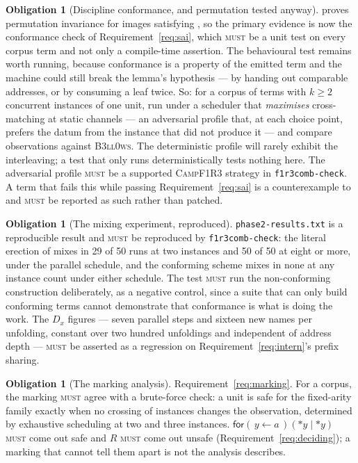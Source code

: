 \documentclass[11pt,a4paper]{article}
\newcommand{\code}[1]{\texttt{#1}}
\newcommand{\Camp}{\textsc{CampF1R3}}
\newcommand{\Bell}{\textsc{B3ll0ws}}
\newcommand{\MUST}{\textsc{must}}
\newcommand{\drp}[1]{{*}#1}
\newcommand{\inp}[3]{\mathsf{for}(\,#1 \leftarrow #2\,)#3}
\theoremstyle{definition}
\newtheorem{obligation}[definition]{Obligation}
\theoremstyle{plain}
\begin{document}
\begin{obligation}[Discipline conformance, and permutation tested anyway]
\label{obl:permutetest}
\cite[Lem.~6.11]{draft3} proves permutation invariance for images satisfying
\cite[Def.~6.10]{draft3}, so the primary evidence is now the conformance check
of Requirement~\ref{req:sai}, which \MUST{} be a unit test on every corpus
term and not only a compile-time assertion. The behavioural test remains
worth running, because conformance is a property of the emitted term and the
machine could still break the lemma's hypothesis --- by handing out comparable
addresses, or by consuming a leaf twice. So: for a corpus of terms with $k \geq 2$ concurrent
instances of one unit, run under a scheduler that \emph{maximises}
cross-matching at static channels --- an adversarial profile that, at each
choice point, prefers the datum from the instance that did not produce it ---
and compare observations against \Bell. The deterministic profile will rarely
exhibit the interleaving; a test that only runs deterministically tests
nothing here. The adversarial profile \MUST{} be a supported \Camp{} strategy
in \code{f1r3comb-check}. A term that fails this while passing
Requirement~\ref{req:sai} is a counterexample to
\cite[Lem.~6.11]{draft3} and \MUST{} be reported as such rather than patched.
\end{obligation}

\begin{obligation}[The mixing experiment, reproduced]\label{obl:mixing}
\code{phase2-results.txt} is a reproducible result and \MUST{} be reproduced
by \code{f1r3comb-check}: the literal erection of
\cite[Def.~6.8]{draft3} mixes in 29 of 50 runs at two instances and 50 of 50
at eight or more, under the parallel schedule, and the conforming scheme mixes
in none at any instance count under either schedule. The test \MUST{} run the
non-conforming construction deliberately, as a negative control, since a suite
that can only build conforming terms cannot demonstrate that conformance is
what is doing the work. The $D_{x}$ figures --- seven parallel steps and
sixteen new names per unfolding, constant over two hundred unfoldings and
independent of address depth --- \MUST{} be asserted as a regression on
Requirement~\ref{req:intern}'s prefix sharing.
\end{obligation}

\begin{obligation}[The marking analysis]\label{obl:marking}
Requirement~\ref{req:marking}. For a corpus, the marking \MUST{} agree with a
brute-force check: a unit is safe for the fixed-arity family exactly when no
crossing of instances changes the observation, determined by exhaustive
scheduling at two and three instances. $\inp{y}{a}{(\drp{y} \mid \drp{y})}$
\MUST{} come out safe and $R$ \MUST{} come out unsafe
(Requirement~\ref{req:deciding}); a marking that cannot tell them apart is
not the analysis \cite[Rem.~6.20]{draft3} describes.
\end{obligation}
\end{document}
